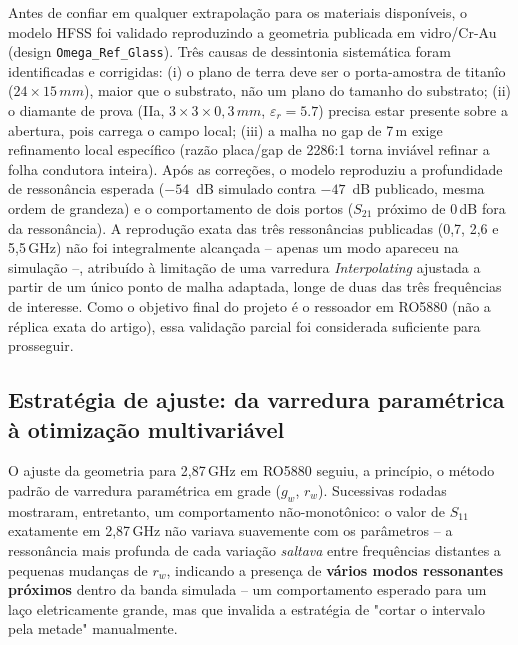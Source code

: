 \documentclass[10pt,a4paper,twocolumn]{article}
\begin{document}
Antes de confiar em qualquer extrapola\c{c}\~ao para os materiais
dispon\'iveis, o modelo HFSS foi validado reproduzindo a geometria
publicada em vidro/Cr-Au \cite{opaluch2021} (design
\texttt{Omega\_Ref\_Glass}). Tr\^es causas de dessintonia sistem\'atica
foram identificadas e corrigidas: (i) o plano de terra deve ser o
porta-amostra de titan\^io ($24\times15\,mm$), maior que o
substrato, n\~ao um plano do tamanho do substrato; (ii) o diamante de
prova (IIa, $3\times3\times0,3\,mm$,
$\varepsilon_r=5.7$) precisa estar presente sobre a abertura, pois
carrega o campo local; (iii) a malha no gap de 7\,\textmu m exige
refinamento local espec\'ifico (raz\~ao placa/gap de 2286:1 torna
invi\'avel refinar a folha condutora inteira). Ap\'os as corre\c{c}\~oes,
o modelo reproduziu a profundidade de resson\^ancia esperada ($-54$~dB
simulado contra $-47$~dB publicado, mesma ordem de grandeza) e o
comportamento de dois portos ($S_{21}$ pr\'oximo de 0\,dB fora da
resson\^ancia). A reprodu\c{c}\~ao exata das tr\^es resson\^ancias
publicadas (0,7, 2,6 e 5,5\,GHz) n\~ao foi
integralmente alcan\c{c}ada -- apenas um modo apareceu na simula\c{c}\~ao
--, atribu\'ido \`a limita\c{c}\~ao de uma varredura \emph{Interpolating}
ajustada a partir de um \'unico ponto de malha adaptada, longe de duas
das tr\^es frequ\^encias de interesse. Como o objetivo final do
projeto \'e o ressoador em RO5880 (n\~ao a r\'eplica exata do artigo),
essa valida\c{c}\~ao parcial foi considerada suficiente para prosseguir.

\subsection{Estrat\'egia de ajuste: da varredura param\'etrica \`a
otimiza\c{c}\~ao multivari\'avel}
\label{subsec:ajuste}

O ajuste da geometria para 2,87\,GHz em RO5880 seguiu, a
princ\'ipio, o m\'etodo padr\~ao de varredura param\'etrica em grade
($g_w$, $r_w$). Sucessivas rodadas mostraram, entretanto, um
comportamento n\~ao-monot\^onico: o valor de $S_{11}$ exatamente em
2,87\,GHz n\~ao variava suavemente com os par\^ametros --
a resson\^ancia mais profunda de cada varia\c{c}\~ao \emph{saltava}
entre frequ\^encias distantes a pequenas mudan\c{c}as de $r_w$,
indicando a presen\c{c}a de \textbf{v\'arios modos ressonantes
pr\'oximos} dentro da banda simulada -- um comportamento esperado para
um la\c{c}o eletricamente grande, mas que invalida a estrat\'egia de
"cortar o intervalo pela metade" manualmente.
\end{document}
